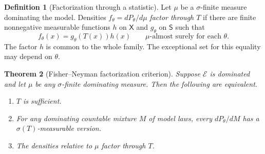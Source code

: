\documentclass[11pt,oneside]{book}
\newtheorem{theorem}{Theorem}[chapter]
\theoremstyle{definition}
\newtheorem{definition}[theorem]{Definition}
\theoremstyle{remark}
\begin{document}
\begin{definition}[Factorization through a statistic]
\label{def:density-factorization-statistic}
Let $\mu$ be a $\sigma$-finite measure dominating the model.
Densities $f_\theta=dP_\theta/d\mu$ \emph{factor through $T$}
if there are finite nonnegative measurable functions
$h$ on $\mathsf X$ and $g_\theta$ on $\mathsf S$ such that
\[
f_\theta(x)=g_\theta(T(x))h(x)
\qquad \mu\text{-almost surely for each }\theta .
\]
The factor $h$ is common to the whole family. The exceptional
set for this equality may depend on $\theta$.
\end{definition}

\begin{theorem}[Fisher--Neyman factorization criterion]
\label{thm:fisher-neyman-factorization}
Suppose $\mathcal E$ is dominated and let $\mu$ be any
$\sigma$-finite dominating measure. Then the following are equivalent.
\begin{enumerate}
\item $T$ is sufficient.
\item For any dominating countable mixture $M$ of model laws,
      every $dP_\theta/dM$ has a $\sigma(T)$-measurable version.
\item The densities relative to $\mu$ factor through $T$.
\end{enumerate}
\end{theorem}
\end{document}
